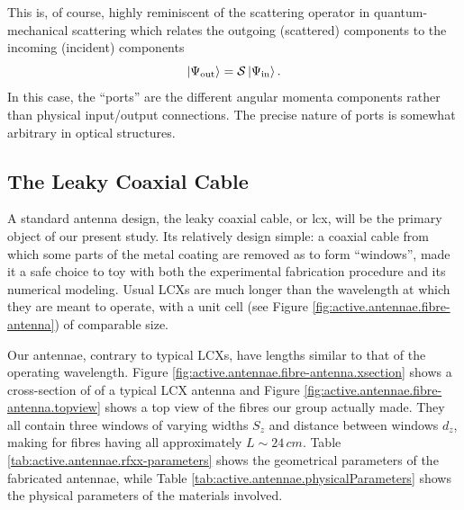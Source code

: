 This is, of course, highly reminiscent of the scattering operator
in quantum-mechanical scattering which relates the outgoing (scattered)
components to the incoming (incident) components
  \begin{equation}
   \Ket{\Psi_\text{out}}=\mathcal{S}\Ket{\Psi_\text{in}}.
  \end{equation}
In this case, the ``ports'' are the different angular momenta
components rather than physical input/output connections. 
The precise nature of ports is somewhat arbitrary in optical structures.

\subsection{The Leaky Coaxial Cable}
A standard antenna design, the leaky coaxial cable, or \gls{lcx}, will be the primary 
object of our present study. Its relatively design simple: a coaxial cable from which
some parts of the metal coating are removed as to form ``windows'', made it a safe choice
to toy with both the experimental fabrication procedure and its numerical modeling. 
Usual LCXs are much longer than the wavelength at which they are meant to operate, with 
a unit cell (see Figure \ref{fig:active.antennae.fibre-antenna}) of comparable size.

Our antennae, contrary to typical LCXs, have lengths similar to that of the operating
wavelength. Figure \ref{fig:active.antennae.fibre-antenna.xsection} shows a cross-section of
of a typical LCX antenna and Figure \ref{fig:active.antennae.fibre-antenna.topview} shows
a top view of the fibres our group actually made. They all contain three windows of varying
widths $S_z$ and distance between windows $d_z$, making for fibres having all approximately
$L\sim24\,\unit{cm}$. Table \ref{tab:active.antennae.rfxx-parameters} shows the geometrical parameters
of the fabricated antennae, while Table \ref{tab:active.antennae.physicalParameters} shows the 
physical parameters of the materials involved. 


